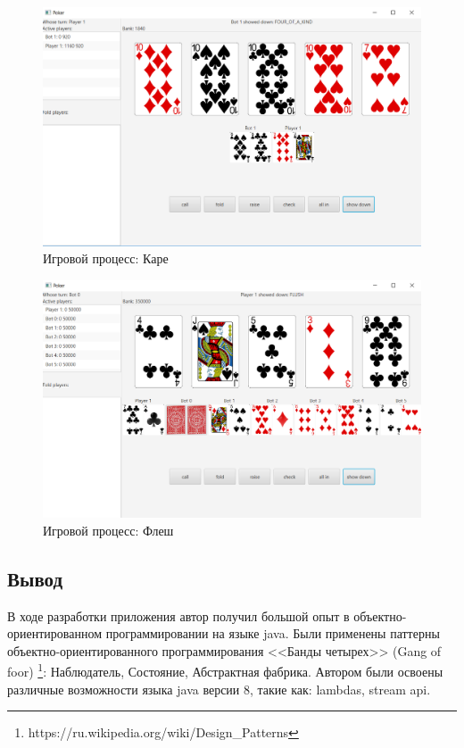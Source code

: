 \begin{figure}[H]
	\begin{center}
		\includegraphics[scale=0.5]{pics/9.png}
	    \caption{Игровой процесс: Каре} 
		\label{pic:gui:6}
	\end{center}
\end{figure}

\begin{figure}[H]
	\begin{center}
		\includegraphics[scale=0.5]{pics/10.png}
	    \caption{Игровой процесс: Флеш} 
		\label{pic:gui:6}
	\end{center}
\end{figure}

\subsection*{Вывод}

В ходе разработки приложения автор получил большой опыт в объектно-ориентированном программировании на языке java. 
Были применены паттерны объектно-ориентированного программирования <<Банды четырех>> (Gang of foor) \footnote{https://ru.wikipedia.org/wiki/Design\_Patterns}: Наблюдатель, Состояние, Абстрактная фабрика. Автором были освоены различные возможности языка java версии 8, такие как: lambdas, stream api.

